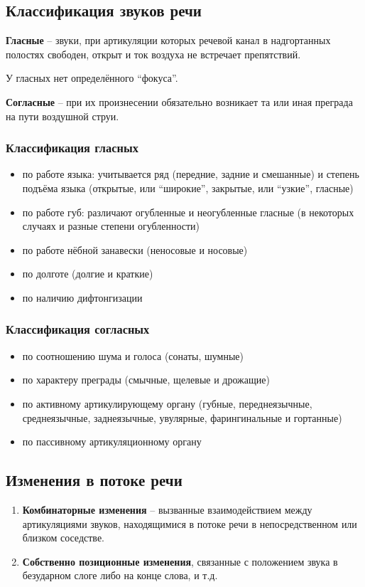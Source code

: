 \documentclass{article}
\begin{document}
\subsection{Классификация звуков речи}
\textbf{Гласные} -- звуки, при артикуляции которых речевой канал в надгортанных
полостях свободен, открыт и ток воздуха не встречает препятствий.

У гласных нет определённого ``фокуса''.

\textbf{Согласные} -- при их произнесении обязательно возникает та или
иная преграда на пути воздушной струи.

\subsubsection{Классификация гласных}
\begin{itemize}
    \item по работе языка: учитывается ряд (передние, задние и смешанные) и степень
     подъёма языка (открытые, или ``широкие'', закрытые, или ``узкие'', гласные)
    \item по работе губ: различают огубленные и неогубленные гласные 
    (в некоторых случаях и разные степени огубленности)
    \item по работе нёбной занавески (неносовые и носовые)
    \item по долготе (долгие и краткие)
    \item по наличию дифтонгизации
\end{itemize}

\subsubsection{Классификация согласных}
\begin{itemize}
    \item по соотношению шума и голоса (сонаты, шумные)
    \item по характеру преграды (смычные, щелевые и дрожащие)
    \item по активному артикулирующему органу (губные, переднеязычные, 
    среднеязычные, заднеязычные, увулярные, фарингинальные и гортанные)
    \item по пассивному артикуляционному органу
\end{itemize}

\subsection{Изменения в потоке речи}
\begin{enumerate}
    \item \textbf{Комбинаторные изменения} -- вызванные взаимодействием между 
    артикуляциями звуков, находящимися в потоке речи в непосредственном или 
    близком соседстве.
    \item \textbf{Собственно позиционные изменения}, связанные с положением
    звука в безударном слоге либо на конце слова, и т.д.
\end{enumerate}
\end{document}

